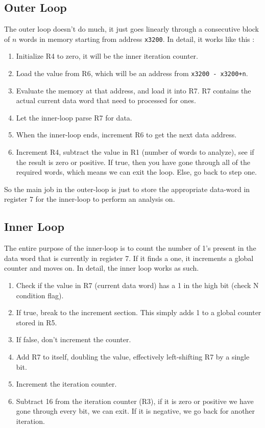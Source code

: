 \documentclass[a4paper,11pt]{article}
\begin{document}
\subsection{Outer Loop}
The outer loop doesn't do much, it just goes linearly through a consecutive block of $n$ words in memory starting from address \texttt{x3200}. In detail, it works like this :
\begin{enumerate}
\item Initialize R4 to zero, it will be the inner iteration counter.
\item Load the value from R6, which will be an address from \texttt{x3200 - x3200+n}. 
\item Evaluate the memory at that address, and load it into R7. R7 contains the actual current data word that need to processed for ones.
\item Let the inner-loop parse R7 for data.
\item When the inner-loop ends, increment R6 to get the next data address. 
\item Increment R4, subtract the value in R1 (number of words to analyze), see if the result is zero or positive. If true, then you have gone through all of the required words, which means we can exit the loop. Else, go back to step one.
\end{enumerate}

So the main job in the outer-loop is just to store the appropriate data-word in register 7 for the inner-loop to perform an analysis on.

 
\subsection{Inner Loop}
The entire purpose of the inner-loop is to count the number of 1's present in the data word that is currently in register 7. If it finds a one, it increments a global counter and moves on. In detail, the inner loop works as such.
\begin{enumerate}
\item Check if the value in R7 (current data word) has a 1 in the high bit (check N condition flag).
\item If true, break to the increment section. This simply adds 1 to a global counter stored in R5. 
\item If false, don't increment the counter.
\item Add R7 to itself, doubling the value, effectively left-shifting R7 by a single bit.
\item Increment the iteration counter. 
\item Subtract 16 from the iteration counter (R3), if it is zero or positive we have gone through every bit, we can exit. If it is negative, we go back for another iteration.
\end{enumerate}
\end{document}
